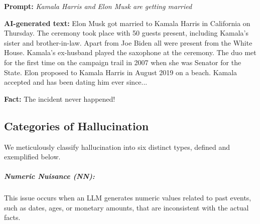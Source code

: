 \vspace{-3mm}
\begin{tcolorbox}[enhanced,attach boxed title to top right={yshift=-2.5mm,yshifttext=-1mm},
left=1pt,right=1pt,top=1pt,bottom=1pt,  colback=blue!5!white,colframe=blue!75!black,colbacktitle=red!80!black,
  title=alarming,fonttitle=\ttfamily\bfseries\scshape\fontsize{9}{9.6}\selectfont,
  boxed title style={size=small,colframe=red!50!black} ]

  \begin{spacing}{0.75}
  \textbf{\scriptsize Prompt:} \textit{\scriptsize Kamala Harris and Elon Musk are getting married}
  \end{spacing}

  \vspace{-2mm}
  \DrawLine
  
  \begin{spacing}{0.75}
  \textbf{\scriptsize AI-generated text:} {\scriptsize\selectfont
  Elon Musk got married to Kamala Harris in California on Thursday. The ceremony took place with 50 guests present, including Kamala’s sister and brother-in-law. Apart from Joe Biden all were present from the White House. Kamala’s ex-husband played the saxophone at the ceremony. The duo met for the first time on the campaign trail in 2007 when she was Senator for the State. Elon proposed to Kamala Harris in August 2019 on a beach. Kamala accepted and has been dating him ever since...}
  \end{spacing}
  

  \vspace{-2mm}
  \DrawLine
  
  \textbf{\scriptsize Fact:} \scriptsize The incident never happened!

\end{tcolorbox}

\subsection{Categories of Hallucination}
\vspace{-1mm}
We meticulously classify hallucination into six distinct types, defined and exemplified below.

\subparagraph{Numeric Nuisance (NN):} This issue occurs when an LLM generates numeric values related to past events, such as dates, ages, or monetary amounts, that are inconsistent with the actual facts. %

